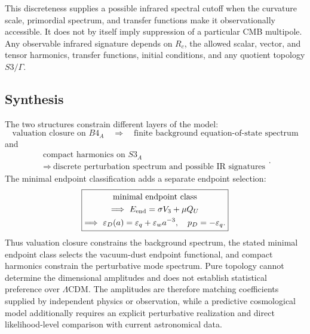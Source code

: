 \documentclass[11pt,a4paper]{article}
\def\Bfour{B4}%
\def\Sthree{S3}%
\def\QU{Q_U}%
\numberwithin{equation}{section}
\theoremstyle{definition}
\theoremstyle{plain}
\theoremstyle{remark}
\newcommand{\Sthree}{S^3}
\newcommand{\Bfour}{B^4}
\newcommand{\epsD}{\varepsilon_D}
\newcommand{\pD}{p_D}
\newcommand{\QU}{Q_U}
\begin{document}
This discreteness supplies a possible infrared spectral cutoff when the curvature scale, primordial spectrum, and transfer functions make it observationally accessible. It does not by itself imply suppression of a particular CMB multipole. Any observable infrared signature depends on \(R_c\), the allowed scalar, vector, and tensor harmonics, transfer functions, initial conditions, and any quotient topology \(\Sthree/\Gamma\).

\subsection{Synthesis}
The two structures constrain different layers of the model:
\begin{equation}
\boxed{
\text{valuation closure on }\Bfour_A
\quad\Longrightarrow\quad
\text{finite background equation-of-state spectrum}
}
\end{equation}
and
\begin{equation}
\boxed{
\begin{gathered}
\text{compact harmonics on }\Sthree_A\\
\Longrightarrow\ \text{discrete perturbation spectrum and possible IR signatures}
\end{gathered}
}.
\end{equation}
The minimal endpoint classification adds a separate endpoint selection:
\begin{equation}
\boxed{
\begin{gathered}
\text{minimal endpoint class}\\
\Longrightarrow\ E_{\rm end}=\sigma V_3+\mu\QU\\
\Longrightarrow\ \epsD(a)=\varepsilon_q+\varepsilon_w a^{-3},\quad \pD=-\varepsilon_q .
\end{gathered}
}
\end{equation}
Thus valuation closure constrains the background spectrum, the stated minimal endpoint class selects the vacuum-dust endpoint functional, and compact harmonics constrain the perturbative mode spectrum. Pure topology cannot determine the dimensional amplitudes and does not establish statistical preference over \(\Lambda\)CDM. The amplitudes are therefore matching coefficients supplied by independent physics or observation, while a predictive cosmological model additionally requires an explicit perturbative realization and direct likelihood-level comparison with current astronomical data.
\end{document}
